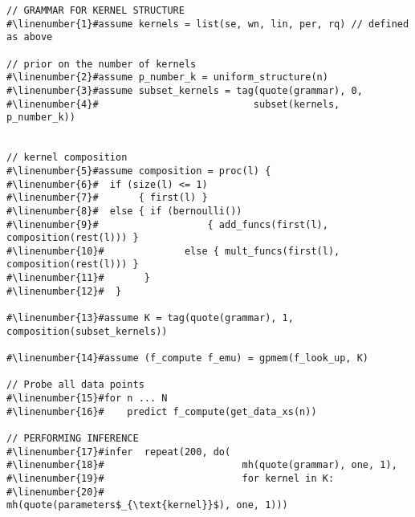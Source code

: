 \begin{mdframed}
\begin{minipage}{\linewidth}
\small
\belowcaptionskip=-10pt
\begin{lstlisting}[mathescape,label=alg:structureVent,basicstyle=\selectfont\ttfamily,numbers=none,escapechar=\#]
// GRAMMAR FOR KERNEL STRUCTURE
#\linenumber{1}#assume kernels = list(se, wn, lin, per, rq) // defined as above

// prior on the number of kernels
#\linenumber{2}#assume p_number_k = uniform_structure(n)
#\linenumber{3}#assume subset_kernels = tag(quote(grammar), 0,
#\linenumber{4}#                           subset(kernels, p_number_k))


// kernel composition
#\linenumber{5}#assume composition = proc(l) {
#\linenumber{6}#  if (size(l) <= 1)
#\linenumber{7}#       { first(l) }
#\linenumber{8}#  else { if (bernoulli()) 
#\linenumber{9}#                   { add_funcs(first(l), composition(rest(l))) }
#\linenumber{10}#              else { mult_funcs(first(l), composition(rest(l))) }
#\linenumber{11}#       }
#\linenumber{12}#  }
                          
#\linenumber{13}#assume K = tag(quote(grammar), 1, composition(subset_kernels))

#\linenumber{14}#assume (f_compute f_emu) = gpmem(f_look_up, K)

// Probe all data points
#\linenumber{15}#for n ... N
#\linenumber{16}#    predict f_compute(get_data_xs(n))

// PERFORMING INFERENCE  
#\linenumber{17}#infer  repeat(200, do(
#\linenumber{18}#                        mh(quote(grammar), one, 1),
#\linenumber{19}#                        for kernel in K: 
#\linenumber{20}# 			    mh(quote(parameters$_{\text{kernel}}$), one, 1)))
\end{lstlisting}

\end{minipage}
\end{mdframed}
